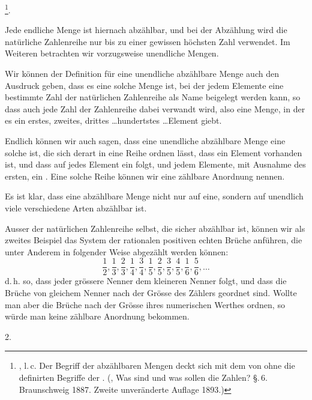 \footnote{, l.\,c. Der Begriff der abzählbaren Mengen deckt sich mit dem von  ohne die  definirten Begriffe der . (, Was sind und was sollen die Zahlen? \S.\,6. Braunschweig 1887. Zweite unveränderte Auflage 1893.)}.

Jede endliche Menge ist hiernach abzählbar, und bei der Abzählung wird die natürliche Zahlenreihe nur bis zu einer gewissen höchsten Zahl verwendet. Im Weiteren betrachten wir vorzugsweise unendliche Mengen.

Wir können der Definition für eine unendliche abzählbare Menge auch den Ausdruck geben, dass es eine solche Menge ist, bei der jedem Elemente eine bestimmte Zahl der natürlichen Zahlenreihe als Name beigelegt werden kann, so dass auch jede Zahl der Zahlenreihe dabei verwandt wird, also eine Menge, in der es ein erstes, zweites, drittes \ldots hundertstes \ldots Element giebt.

Endlich können wir auch sagen, dass eine unendliche abzählbare Menge eine solche ist, die sich derart in eine Reihe ordnen lässt, dass ein  Element vorhanden ist, und dass auf jedes Element ein  folgt, und jedem Elemente, mit Ausnahme des ersten, ein . Eine solche Reihe können wir eine zählbare Anordnung nennen.

Es ist klar, dass eine abzählbare Menge nicht nur auf eine, sondern auf unendlich viele verschiedene Arten abzählbar ist.

Ausser der natürlichen Zahlenreihe selbst, die sicher abzählbar ist, können wir als zweites Beispiel das System der rationalen positiven echten Brüche anführen, die unter Anderem in folgender Weise abgezählt werden können:
\[
\frac{1}{2}, \frac{1}{3}, \frac{2}{3}, \frac{1}{4}, \frac{3}{4}, \frac{1}{5}, \frac{2}{5}, \frac{3}{5}, \frac{4}{5}, \frac{1}{6}, \frac{5}{6}, \ldots
\]
d.\,h. so, dass jeder grössere Nenner dem kleineren Nenner folgt, und dass die Brüche von gleichem Nenner nach der Grösse des Zählers geordnet sind. Wollte man aber die Brüche nach der Grösse ihres numerischen Werthes ordnen, so würde man keine zählbare Anordnung bekommen.

2. 
